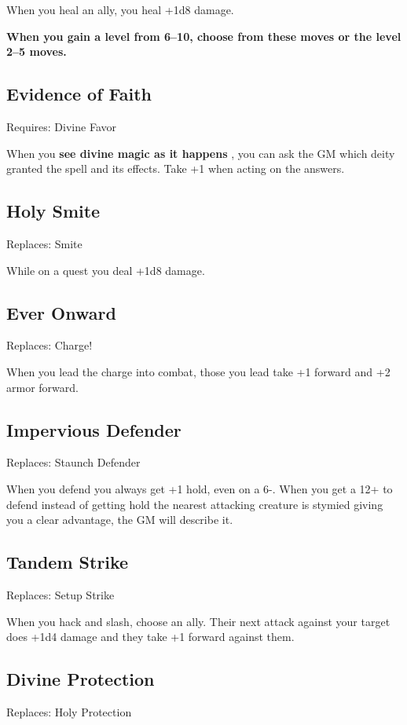 When you heal an ally, you heal +1d8 damage.

\vspace{\baselineskip}
{\bfseries When you gain a level from 6--10, choose from these moves or the level 2--5 moves.}
\subsection{Evidence of Faith}

Requires: Divine Favor

When you \textbf{see divine magic as it happens}
, you can ask the GM which deity granted the spell and its effects. Take +1 when acting on the answers.
\subsection{Holy Smite}

Replaces: Smite

While on a quest you deal +1d8 damage.
\subsection{Ever Onward}

Replaces: Charge!

When you lead the charge into combat, those you lead take +1 forward and +2 armor forward.
\subsection{Impervious Defender}

Replaces: Staunch Defender

When you defend you always get +1 hold, even on a 6-. When you get a 12+ to defend instead of getting hold the nearest attacking creature is stymied giving you a clear advantage, the GM will describe it.
\subsection{Tandem Strike}

Replaces: Setup Strike

When you hack and slash, choose an ally. Their next attack against your target does +1d4 damage and they take +1 forward against them.
\subsection{Divine Protection}

Replaces: Holy Protection

